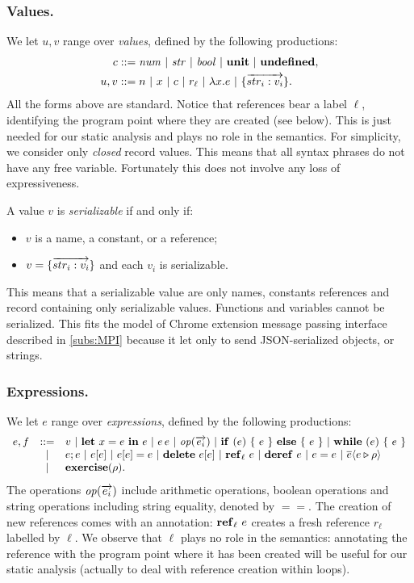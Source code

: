 \subsubsection{Values.}
We let $u,v$ range over \emph{values}, defined by the following productions:
\begin{align*}
c & ::= \mathit{num} ~|~ \mathit{str} ~|~ \mathit{bool} ~|~ \mathbf{unit} ~|~ \mathbf{undefined}, \\
u,v &::= n ~|~ x ~|~ c ~|~ r_{\ell} ~|~ \lambda x.e ~|~ \{\overrightarrow{str_i:v_i}\}.
\end{align*}
All the forms above are standard. Notice that references bear a label $\ell$, identifying the program point where they are created (see below). This is just needed for our static analysis and plays no role in the semantics. For simplicity, we consider only \emph{closed} record values. This means that all syntax phrases do not have any free variable. Fortunately this does not involve any loss of expressiveness.

\begin{definition}
\label{def:serializable}
A value $v$ is \emph{serializable} if and only if:
\begin{itemize}
\item $v$ is a name, a constant, or a reference;
\item $v = \{\overrightarrow{str_i:v_i}\}$ and each $v_i$ is serializable.
\end{itemize}
\end{definition}
This means that a serializable value are only names, constants references and record containing only serializable values. Functions and variables cannot be serialized. This fits the model of Chrome extension message passing interface described in \ref{subs:MPI} because it let only to send JSON-serialized objects, or strings.

\subsubsection{Expressions.} 
We let $e$ range over \emph{expressions}, defined by the following productions:
\[
\begin{array}{lcl}
e,f & ::= & v ~|~ \mathbf{let}\ x = e\ \mathbf{in}\ e ~|~ e\, e ~|~ \mathit{op}(\overrightarrow{e_i}) ~|~ \mathbf{if}\ (e)\ \{\ e\ \}\ \mathbf{else}\ \{\ e\ \} ~|~ \mathbf{while}\ (e)\ \{\ e\ \} \\
& | & e;e ~|~ e[e] ~|~ e[e] = e ~|~ \mathbf{delete}\ e[e] ~|~ \mathbf{ref}_{\ell}\ e ~|~ \mathbf{deref}\ e ~|~ e = e ~|~ \overline{e} \langle e \triangleright \rho \rangle \\
& | & \mathbf{exercise}(\rho).
\end{array}
\]
The operations $\mathit{op}(\overrightarrow{e_i})$ include arithmetic operations, boolean
operations and string operations including string equality, denoted by
$==$. The creation of new references comes with an annotation:
$\mathbf{ref}_{\ell}\ e$ creates a fresh reference $r_\ell$ labelled by $\ell$.
We observe that $\ell$ plays no role in the semantics: annotating the reference
with the program point where it has been created will be useful for our
static analysis (actually to deal with reference creation within
loops).

